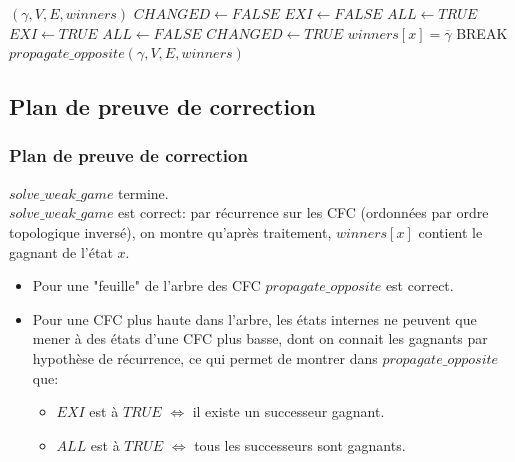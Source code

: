 \documentclass[11pt]{beamer}
\begin{document}
\begin{algorithm}[h!]
\caption{$propagate\_opposite$}

\begin{algorithmic}[1]
    \scriptsize
    \REQUIRE $(\gamma, V, E, winners)$
    \STATE $CHANGED \leftarrow FALSE$
            \STATE $EXI \leftarrow FALSE$
            \STATE $ALL \leftarrow TRUE$
                    \STATE $EXI \leftarrow TRUE$
                \ELSE
                    \STATE $ALL \leftarrow FALSE$
                \ENDIF
            \ENDFOR
                \STATE $CHANGED \leftarrow TRUE$
                \STATE $winners[x] = \overline{\gamma}$
                \STATE BREAK 
            \ENDIF
        \ENDIF
    \ENDFOR
        \STATE $propagate\_opposite(\gamma, V, E, winners)$
    \ENDIF
    \RETURN
\end{algorithmic}
\end{algorithm}

\subsection{Plan de preuve de correction}
\begin{frame}
	\frametitle{Plan de preuve de correction}
	$solve\_weak\_game$ termine. \\
	\bigskip \pause
	$solve\_weak\_game$ est correct: par récurrence sur les CFC (ordonnées par ordre topologique inversé), on montre qu'après traitement, $winners[x]$ contient le gagnant de l'état $x$.
	\begin{itemize}
		\item Pour une "feuille" de l'arbre des CFC $propagate\_opposite$ est correct.
		\item Pour une CFC plus haute dans l'arbre, les états internes ne peuvent que mener à des états d'une CFC plus basse, dont on connait les gagnants par hypothèse de récurrence, ce qui permet de montrer dans $propagate\_opposite$ que:
		\begin{itemize}
			\item $EXI$ est à $TRUE$ $\iff$ il existe un successeur gagnant.
			\item $ALL$ est à $TRUE$ $\iff$ tous les successeurs sont gagnants.
		\end{itemize}
	\end{itemize}
\end{frame}
\end{document}
